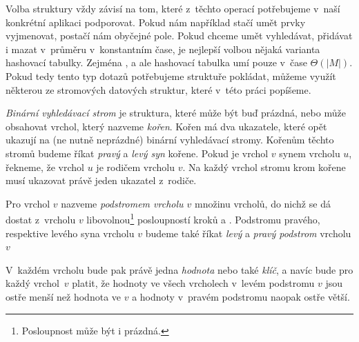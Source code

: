 Volba struktury vždy závisí na tom, které z~těchto
operací potřebujeme v~naší konkrétní aplikaci podporovat. Pokud nám například
stačí umět prvky vyjmenovat, postačí nám obyčejné pole. Pokud chceme umět
vyhledávat, přidávat i mazat v~průměru v~konstantním čase, je nejlepší volbou nějaká
varianta hashovací tabulky. Zejména ,  a  ale hashovací
tabulka umí pouze v~čase $\Theta(|M|)$. Pokud tedy tento typ dotazů potřebujeme
struktuře pokládat, můžeme využít některou ze stromových datových struktur,
které v~této práci popíšeme.

\begin{definice}

\emph{Binární vyhledávací strom} je struktura, které může být buď prázdná, nebo
může obsahovat vrchol, který nazveme \emph{kořen}. Kořen má dva ukazatele,
které opět ukazují na (ne nutně neprázdné) binární vyhledávací stromy. Kořenům těchto stromů budeme říkat \emph{pravý} a \emph{levý syn} kořene. Pokud je vrchol $v$ synem vrcholu $u$, řekneme, že vrchol $u$ je rodičem vrcholu $v$. Na každý vrchol stromu krom kořene musí ukazovat právě jeden ukazatel z~rodiče. 

Pro vrchol $v$ nazveme
\emph{podstromem vrcholu $v$} množinu vrcholů, do nichž se dá dostat z~vrcholu
$v$ libovolnou\footnote{Posloupnost může být i prázdná.} posloupností kroků 
 a . Podstromu pravého, respektive levého syna vrcholu $v$ budeme také říkat \emph{levý} a \emph{pravý podstrom} vrcholu $v$

V~každém vrcholu bude pak právě jedna \emph{hodnota} nebo také \emph{klíč}, a navíc bude pro každý vrchol~$v$ platit, že hodnoty ve všech vrcholech v~levém podstromu $v$ jsou ostře menší než hodnota ve $v$ a hodnoty v~pravém podstromu naopak ostře větší.
\end{definice}

